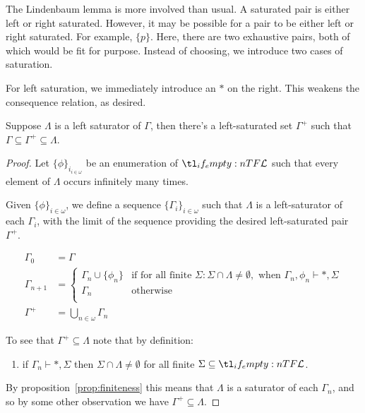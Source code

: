 \documentclass[10pt]{article}
\begin{document}
The Lindenbaum lemma is more involved than usual.
A saturated pair is either left or right saturated.
However, it may be possible for a pair to be either left or right saturated.
For example, \(\{p\}\).
Here, there are two exhaustive pairs, both of which would be fit for purpose.
Instead of choosing, we introduce two cases of saturation.

For left saturation, we immediately introduce an \(\ast\) on the right.
This weakens the consequence relation, as desired.

\begin{lemma}\label{lindenbaum:left}
  Suppose \(\Lambda\) is a left saturator of \(\Gamma\), then there's a left-saturated set \(\Gamma^{+}\) such that \(\Gamma \subseteq \Gamma^{+} \subseteq \Lambda\).
  \begin{proof}
    Let \(\{\phi\}_{i_{i \in \omega}}\) be an enumeration of \(\olang{}\) such that every element of \(\Lambda\) occurs infinitely many times.\nolinebreak

    Given \(\{\phi\}_{i \in \omega}\), we define a sequence \(\{\Gamma_{i}\}_{i \in \omega}\) such that \(\Lambda\) is a left-saturator of each \(\Gamma_{i}\), with the limit of the sequence providing the desired left-saturated pair \(\Gamma^{+}\).

    \begin{align*}
      \Gamma_{0} &= \Gamma \\
      \Gamma_{n+1} &=
                                                  \begin{cases}
                                                    \Gamma_{n} \cup \{\phi_{n}\} &\text{if for all finite } \Sigma \colon \Sigma \cap \Lambda \ne \emptyset, \text{ when } \Gamma_{n},\phi_{n} \vdash \ast, \Sigma \\
                                                    \Gamma_{n}
                                                    &\text{otherwise} \\
                                                  \end{cases}
      \\
      \Gamma^{+} &= \bigcup_{n \in \omega}\Gamma_{n}
    \end{align*}

    To see that \(\Gamma^{+} \subseteq \Lambda\) note that by definition:
    \begin{enumerate}[label=(\arabic*)]
    \item\label{leftLindenbaum:1} if \(\Gamma_{n} \vdash \ast, \Sigma\) then \(\Sigma \cap \Lambda \ne \emptyset\) for all finite \(\Sigma \subseteq \olang{}\).
    \end{enumerate}
    By proposition~\ref{prop:finiteness} this means that \(\Lambda\) is a saturator of each \(\Gamma_{n}\), and so by some other observation we have \(\Gamma^{+} \subseteq \Lambda\).


\end{proof}
\end{lemma}
\end{document}
